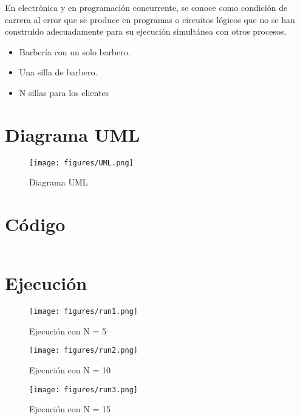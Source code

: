 \documentclass[12pt]{article}
\begin{document}
En electrónica y en programación concurrente, se conoce como condición
de carrera al error que se produce en programas o circuitos lógicos
que no se han construido adecuadamente para su ejecución simultánea
con otros procesos.

\begin{itemize}
\item Barbería con un solo barbero.
\item Una silla de barbero.
\item N sillas para los clientes
\end{itemize}

\section*{Diagrama UML}

\begin{figure}[H]
  \centering
  \texttt{[image: figures/UML.png]}
  \caption{Diagrama UML}
\end{figure}


\section*{Código}

\inputminted{Java}{BarberoDurmiente.java}

\section*{Ejecución}

\begin{figure}[H]
  \centering
  \texttt{[image: figures/run1.png]}
  \caption{Ejecución con N = 5}
\end{figure}

\begin{figure}[H]
  \centering
  \texttt{[image: figures/run2.png]}
  \caption{Ejecución con N = 10}
\end{figure}

\begin{figure}[H]
  \centering
  \texttt{[image: figures/run3.png]}
  \caption{Ejecución con N = 15}
\end{figure}
\end{document}
